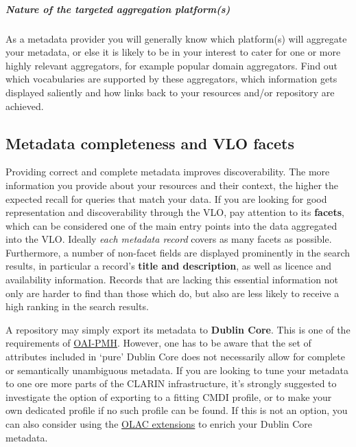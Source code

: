 \begin{workinprogress}
\subparagraph{Nature of the targeted aggregation
platform(s)} \label{nature-of-the-targeted-aggregation-platforms}

As a metadata provider you will generally know which platform(s) will aggregate your metadata, or else it is likely to be in your interest to cater for one or more highly relevant aggregators, for example popular domain aggregators. Find out which vocabularies are supported by these aggregators, which information gets displayed saliently and how links back to your resources and/or repository are achieved.

\subsection{Metadata completeness and VLO facets} \label{metadata-completeness-and-vlo-facets}

Providing correct and complete metadata improves discoverability. The more information you provide about your resources and their context, the higher the expected recall for queries that match your data. If you are looking for good representation and discoverability through the VLO, pay
attention to its \textbf{facets}, which can be considered one of the main entry points into the data aggregated into the VLO. Ideally \emph{each metadata record} covers as many facets as possible. Furthermore, a number of non-facet fields are displayed prominently in the search results, in particular a record's \textbf{title and description}, as well as licence and availability information. Records that are lacking this essential information not only are harder to find than those which do, but also are less likely to receive a high ranking
in the search results. 

A repository may simply export its metadata to \textbf{Dublin Core}. This is one of the requirements of 
\href{https://www.openarchives.org/OAI/2.0/openarchivesprotocol.2015-01-08.htm\#Record}{OAI-PMH}. However, one has to be aware that the set of attributes included in `pure' Dublin Core does not necessarily allow for complete or semantically unambiguous metadata. If you are looking to tune your metadata to one ore more parts of the CLARIN infrastructure, it's strongly suggested to investigate the option of exporting to a fitting
CMDI profile, or to make your own dedicated profile if no such profile can be found. If this is not an option, you can also consider using the \href{http://www.language-archives.org/OLAC/metadata.html}{OLAC extensions} to enrich your Dublin Core metadata.


\end{workinprogress}
